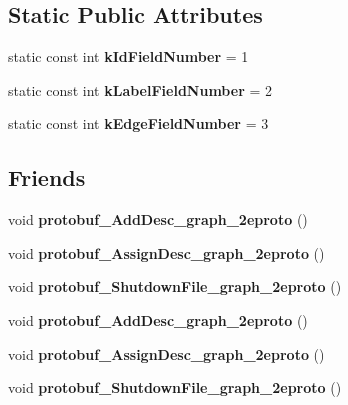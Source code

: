 \subsection*{Static Public Attributes}
\begin{DoxyCompactItemize}
\item 
\hypertarget{classgraph_1_1Graph__Node_a64bb5b3869f25b9090ab28bb9a36771c}{
static const int {\bfseries kIdFieldNumber} = 1}
\label{classgraph_1_1Graph__Node_a64bb5b3869f25b9090ab28bb9a36771c}

\item 
\hypertarget{classgraph_1_1Graph__Node_ad7acd0364613fb8c7705b73c4501f1a2}{
static const int {\bfseries kLabelFieldNumber} = 2}
\label{classgraph_1_1Graph__Node_ad7acd0364613fb8c7705b73c4501f1a2}

\item 
\hypertarget{classgraph_1_1Graph__Node_a4e420c8292b17a5c36c317485d324025}{
static const int {\bfseries kEdgeFieldNumber} = 3}
\label{classgraph_1_1Graph__Node_a4e420c8292b17a5c36c317485d324025}

\end{DoxyCompactItemize}
\subsection*{Friends}
\begin{DoxyCompactItemize}
\item 
\hypertarget{classgraph_1_1Graph__Node_a3216c708da10839178deebea43d6f0be}{
void {\bfseries protobuf\_\-AddDesc\_\-graph\_\-2eproto} ()}
\label{classgraph_1_1Graph__Node_a3216c708da10839178deebea43d6f0be}

\item 
\hypertarget{classgraph_1_1Graph__Node_a4c9d7eb8f9e30e490c8bcae70e629de5}{
void {\bfseries protobuf\_\-AssignDesc\_\-graph\_\-2eproto} ()}
\label{classgraph_1_1Graph__Node_a4c9d7eb8f9e30e490c8bcae70e629de5}

\item 
\hypertarget{classgraph_1_1Graph__Node_aac10332314561225d8ac09b797223f3d}{
void {\bfseries protobuf\_\-ShutdownFile\_\-graph\_\-2eproto} ()}
\label{classgraph_1_1Graph__Node_aac10332314561225d8ac09b797223f3d}

\item 
\hypertarget{classgraph_1_1Graph__Node_a3216c708da10839178deebea43d6f0be}{
void {\bfseries protobuf\_\-AddDesc\_\-graph\_\-2eproto} ()}
\label{classgraph_1_1Graph__Node_a3216c708da10839178deebea43d6f0be}

\item 
\hypertarget{classgraph_1_1Graph__Node_a4c9d7eb8f9e30e490c8bcae70e629de5}{
void {\bfseries protobuf\_\-AssignDesc\_\-graph\_\-2eproto} ()}
\label{classgraph_1_1Graph__Node_a4c9d7eb8f9e30e490c8bcae70e629de5}

\item 
\hypertarget{classgraph_1_1Graph__Node_aac10332314561225d8ac09b797223f3d}{
void {\bfseries protobuf\_\-ShutdownFile\_\-graph\_\-2eproto} ()}
\label{classgraph_1_1Graph__Node_aac10332314561225d8ac09b797223f3d}

\end{DoxyCompactItemize}


